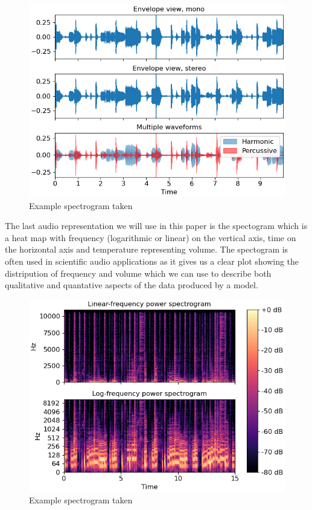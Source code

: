 \documentclass{article}
\begin{document}
\begin{figure}[H]
\caption{Example spectrogram taken \cite{mcfee2015librosa}}
\includegraphics[scale=0.5]{librosa-display-waveshow-1_00.png}
\end{figure}
The last audio representation we will use in this paper is the spectogram which is a heat map with frequency (logarithmic or linear) on the vertical axis, time on the horizontal axis and temperature representing volume. The spectogram is often used in scientific audio applications as it gives us a clear plot showing the distripution of frequency and volume which we can use to describe both qualitative and quantative aspects of the data produced by a model. 
\begin{figure}[H]
\caption{Example spectrogram taken \cite{mcfee2015librosa}}
\includegraphics[scale=0.5]{librosa-display-specshow-1.png}
\end{figure}
\label{sec:data}
\end{document}
